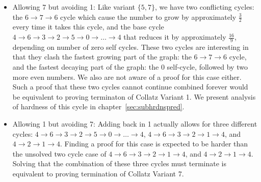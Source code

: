\begin{itemize}
\begin{itemize}
        \item Allowing 7 but avoiding 1: Like variant $\{5,7\}$, we have two conflicting cycles: the $6 \rightarrow 7 \rightarrow 6$ cycle which cause the number to grow by approximately $\frac{3}{2}$ every time it takes this cycle, and the base cycle $4 \rightarrow 6 \rightarrow 3 \rightarrow 2 \rightarrow 5 \rightarrow 0 \rightarrow \ldots \rightarrow 4$ that reduces it by approximately $\frac{16}{9}$, depending on number of zero self cycles. These two cycles are interesting in that they clash the fastest growing part of the graph: the $6 \rightarrow 7 \rightarrow 6$ cycle, and the fastest decaying part of the graph: the 0 self-cycle, followed by two more even numbers. We also are not aware of a proof for this case either. Such a proof that these two cycles cannot continue combined forever would be equivalent to proving terminaton of Collatz Variant 1. We present analysis of hardness of this cycle in chapter~\ref{sec:subhrdnspred}.
        \item Allowing 1 but avoiding 7: Adding back in 1 actually allows for three different cycles: $4 \rightarrow 6 \rightarrow 3 \rightarrow 2 \rightarrow 5 \rightarrow 0 \rightarrow \ldots \rightarrow 4$, $4 \rightarrow 6 \rightarrow 3 \rightarrow 2 \rightarrow 1 \rightarrow 4$, and $4 \rightarrow 2 \rightarrow 1 \rightarrow 4$.  Finding a proof for this case is expected to be harder than the unsolved two cycle case of $4 \rightarrow 6 \rightarrow 3 \rightarrow 2 \rightarrow 1 \rightarrow 4$, and $4 \rightarrow 2 \rightarrow 1 \rightarrow 4$. Solving that the combination of these three cycles must terminate is equivalent to proving termination of Collatz Variant 7.
    \end{itemize}
\end{itemize}
